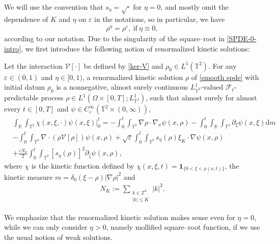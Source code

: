 We will use the convention that $s_{\eta} = \sqrt{\cdot}$ for $\eta = 0$, and mostly omit the dependence of $K$ and $\eta$ on $\varepsilon$ in the notations, so in particular, we have 
\begin{align*}
\rho^{\eta} = \rho^{\varepsilon}, \ \text{if} \ \eta \equiv 0,
\end{align*}
according to our notation. Due to the singularity of the square--root in \eqref{SPDE-0-intro}, we first introduce the following notion of renormalized kinetic solutions:
\begin{defi}\label{RKS smooth spde}Let the interaction $\mathcal{V}[\cdot]$ be defined by \eqref{ker-V} and $\rho_0\in L^{1}(\mathbb{T}^2)$. For any $\varepsilon \in (0,1)$ and $\eta \in[0,1)$, a renormalized kinetic solution $\rho$ of \eqref{smooth spde} with initial datum $\rho_0$ is a nonnegative, almost surely continuous $L^1_{\mathbb{T}^2}$-valued $\mathcal{F}_t$-predictable process $\rho \in L^1\left(\Omega \times[0, T] ; L^1_{\mathbb{T}^2}\right)$, such that almost surely for almost every $t \in[0, T]$ and $\psi \in C_{c}^{\infty}(\mathbb{T}^2 \times(0, \infty))$,
 \begin{equation}
 \begin{aligned}
&\int_{\mathbb{R}}\int_{\mathbb{T}^2} \chi(x, \xi, \cdot) \psi(x, \xi) \Big|^t_0= -\int_{0}^{t} \int_{\mathbb{T}^2}\nabla\rho \cdot\nabla_x\psi(x,\rho)
-\int_{0}^{t} \int_{\mathbb{R}} \int_{\mathbb{T}^2} \partial_{\xi} \psi(x, \xi) \mathrm{d}m\\
&
-\int_{0}^{t} \int_{\mathbb{T}^2} \nabla\cdot \left(\rho \mathcal{V}[\rho]\right)\psi(x, \rho)
+\sqrt{\varepsilon}\int_{0}^{t} \int_{\mathbb{T}^2} s_{\eta}(\rho)\xi_{K}\cdot \nabla \psi(x, \rho)\\
&+\frac{\varepsilon N_k}{2}\int_{0}^{t} \int_{\mathbb{T}^2}[s_{\eta}(\rho)]^2 \partial_{\zeta} \psi(x, \rho),
\end{aligned}
\end{equation}
where $\chi$ is the kinetic function defined by $\chi(x,\xi,t)=\mathbf{1}_{\{0<\xi<\rho(x,t)\}}$, the kinetic measure $m=\delta_0(\xi-\rho)|\nabla\rho|^2$ and 
\begin{align}
N_K := \sum_{\substack{k\in \mathbb{Z}^{d}\\|k| \leq K}}|k|^2.
\end{align}
\end{defi}

We emphasize that the renormalized kinetic solution makes sense even for $\eta = 0$, while we can only consider $\eta > 0$, namely mollified square--root function, if we use the usual notion of weak solutions. 

